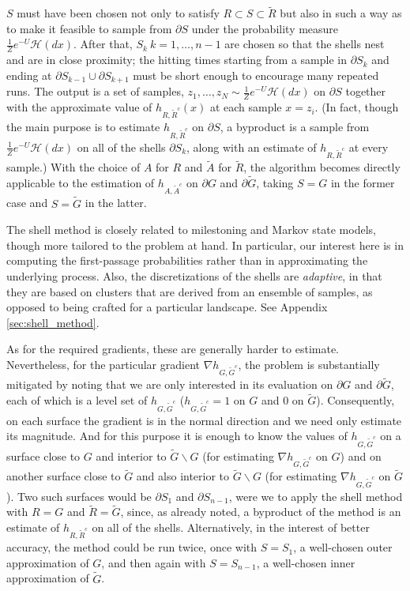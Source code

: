 \documentclass[12pt, nofootinbib,english, amsmath, amssymb, aps, priprint, graphicx,floatfix,draft]{revtex4-1}
\theoremstyle{plain}
\theoremstyle{definition}
\theoremstyle{plain}
\newcommand{\hausdorffmeasure}{\mathscr{H}(dx)}
\begin{document}
$S$ must have been chosen not only to satisfy $R\subset S  \subset\tilde{R}$ but also in such a way as to make it feasible to sample from $\partial S$ under the probability measure
$\frac{1}{Z}e^{-U}\hausdorffmeasure$. After that, $S_k\ k=1,\ldots,n-1$ are chosen so that the shells nest and are in close proximity; the hitting times starting from a sample in $\partial
 S_k$ and ending at $\partial S_{k-1} \cup \partial S_{k+1}$ must be short enough to encourage many repeated runs. The output is a set of samples,
 $z_1,\ldots,z_N \sim \frac{1}{Z}e^{-U}\hausdorffmeasure$ on $\partial S$ together with the approximate value of $h_{R,\tilde{R}^c}(x)$ at each sample $x=z_i$. (In fact, though the main purpose is to estimate $h_{R,\tilde{R}^c}$ on
 $\partial S$, a byproduct is a sample from $\frac{1}{Z}e^{-U}\hausdorffmeasure$ on all of the shells $\partial S_k$, along with an estimate of $h_{R,\tilde{R}^c}$ at every sample.)
With the choice of $A$ for $R$ and $\tilde A$ for $\tilde R$, the algorithm becomes directly applicable to the estimation of $h_{A, \tilde{A}^c}$ on $\partial G$ and $\partial\tilde{G}$, taking $S=G$ in the former case and $S=\tilde{G}$ in the latter.

The shell method is closely related to milestoning\cite{West2007-cn, Bello-Rivas2015-ld, Aristoff2016-gc} and Markov state models\cite{Pande2010-yi, Chodera2014-bh, Husic2018-xp}, though more tailored to the problem at hand. In particular, our interest here is in computing the first-passage probabilities rather than in approximating the underlying process. Also, the discretizations of the shells are {\em adaptive}, in that they are based on clusters that are derived from an ensemble of samples, as opposed to being crafted for a particular landscape.  See Appendix \ref{sec:shell_method}.

As for the required gradients, these are generally harder to estimate. Nevertheless, for the particular gradient $\nabla h_{G, \tilde{G}^c}$, the problem is substantially mitigated by noting that we are only interested in its evaluation on $\partial G$ and $\partial\tilde G$, each of which is a level set of
$h_{G, \tilde{G}^c}$ ($h_{G, \tilde{G}^c}=1$ on $G$ and 0 on $\tilde G$). Consequently, on each surface the gradient is in the normal direction and we need only estimate its magnitude. And for this purpose it is enough to know the values of $h_{G, \tilde{G}^c}$ on a surface close to $G$ and interior to $\tilde{G}\backslash G$ (for estimating $\nabla h_{G, \tilde{G}^c}$ on $G$) and on another surface
close to $\tilde{G}$ and also interior to $\tilde{G}\backslash G$ (for estimating $\nabla h_{G, \tilde{G}^c}$ on $\tilde G$). Two such surfaces would be $\partial S_1$ and $\partial S_{n-1}$, were we to apply the shell method with $R=G$ and $\tilde{R}=\tilde{G}$,
since, as already noted, a byproduct of the method is an estimate of
$h_{R,\tilde{R}^c}$ on all of the shells. Alternatively, in the interest of better accuracy, the method could be run twice, once with $S=S_1$, a well-chosen outer approximation of $G$, and then again with
$S=S_{n-1}$, a well-chosen inner approximation of $\tilde G$.
\end{document}
